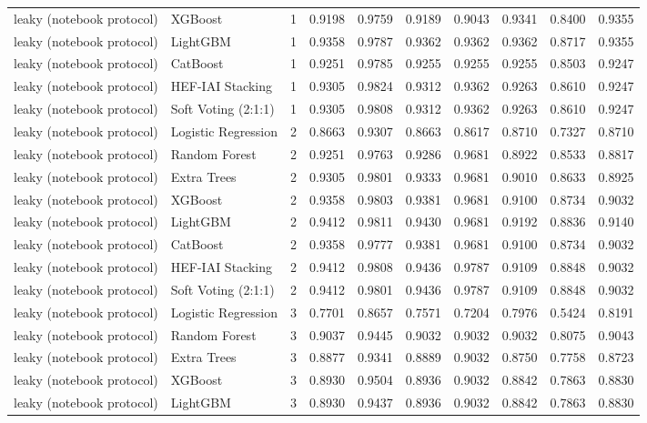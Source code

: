 \begin{tabular}{llrrrrrrrr}
leaky (notebook protocol) & XGBoost & 1 & 0.9198 & 0.9759 & 0.9189 & 0.9043 & 0.9341 & 0.8400 & 0.9355 \\
leaky (notebook protocol) & LightGBM & 1 & 0.9358 & 0.9787 & 0.9362 & 0.9362 & 0.9362 & 0.8717 & 0.9355 \\
leaky (notebook protocol) & CatBoost & 1 & 0.9251 & 0.9785 & 0.9255 & 0.9255 & 0.9255 & 0.8503 & 0.9247 \\
leaky (notebook protocol) & HEF-IAI Stacking & 1 & 0.9305 & 0.9824 & 0.9312 & 0.9362 & 0.9263 & 0.8610 & 0.9247 \\
leaky (notebook protocol) & Soft Voting (2:1:1) & 1 & 0.9305 & 0.9808 & 0.9312 & 0.9362 & 0.9263 & 0.8610 & 0.9247 \\
leaky (notebook protocol) & Logistic Regression & 2 & 0.8663 & 0.9307 & 0.8663 & 0.8617 & 0.8710 & 0.7327 & 0.8710 \\
leaky (notebook protocol) & Random Forest & 2 & 0.9251 & 0.9763 & 0.9286 & 0.9681 & 0.8922 & 0.8533 & 0.8817 \\
leaky (notebook protocol) & Extra Trees & 2 & 0.9305 & 0.9801 & 0.9333 & 0.9681 & 0.9010 & 0.8633 & 0.8925 \\
leaky (notebook protocol) & XGBoost & 2 & 0.9358 & 0.9803 & 0.9381 & 0.9681 & 0.9100 & 0.8734 & 0.9032 \\
leaky (notebook protocol) & LightGBM & 2 & 0.9412 & 0.9811 & 0.9430 & 0.9681 & 0.9192 & 0.8836 & 0.9140 \\
leaky (notebook protocol) & CatBoost & 2 & 0.9358 & 0.9777 & 0.9381 & 0.9681 & 0.9100 & 0.8734 & 0.9032 \\
leaky (notebook protocol) & HEF-IAI Stacking & 2 & 0.9412 & 0.9808 & 0.9436 & 0.9787 & 0.9109 & 0.8848 & 0.9032 \\
leaky (notebook protocol) & Soft Voting (2:1:1) & 2 & 0.9412 & 0.9801 & 0.9436 & 0.9787 & 0.9109 & 0.8848 & 0.9032 \\
leaky (notebook protocol) & Logistic Regression & 3 & 0.7701 & 0.8657 & 0.7571 & 0.7204 & 0.7976 & 0.5424 & 0.8191 \\
leaky (notebook protocol) & Random Forest & 3 & 0.9037 & 0.9445 & 0.9032 & 0.9032 & 0.9032 & 0.8075 & 0.9043 \\
leaky (notebook protocol) & Extra Trees & 3 & 0.8877 & 0.9341 & 0.8889 & 0.9032 & 0.8750 & 0.7758 & 0.8723 \\
leaky (notebook protocol) & XGBoost & 3 & 0.8930 & 0.9504 & 0.8936 & 0.9032 & 0.8842 & 0.7863 & 0.8830 \\
leaky (notebook protocol) & LightGBM & 3 & 0.8930 & 0.9437 & 0.8936 & 0.9032 & 0.8842 & 0.7863 & 0.8830 \\

\end{tabular}
